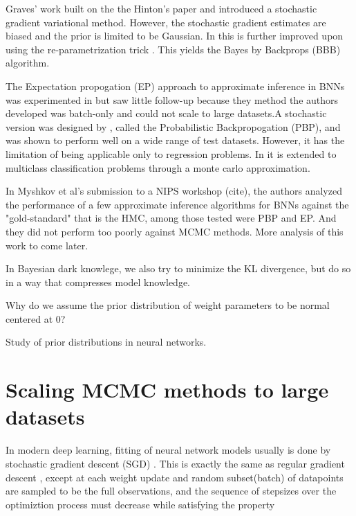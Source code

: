 \documentclass{book}
\begin{document}
\begin{enumerate}
Graves' work \cite{graves2011practical} built on the the Hinton's paper and introduced a stochastic gradient variational method. However, the stochastic gradient estimates are biased and the prior is limited to be Gaussian. In \cite{blundell2015weight} this is further improved upon using the re-parametrization trick \cite{opper2009variational,kingma2013auto,rezende2014stochastic}. This yields the Bayes by Backprops (BBB) algorithm.

The Expectation propogation (EP) approach to approximate inference in BNNs was experimented in \cite{jylanki2014expectation} but saw little follow-up because they method the authors developed was batch-only and could not scale to large datasets.A stochastic version was designed by \cite{hernandez2015probabilistic}, called the Probabilistic Backpropogation (PBP), and was shown to perform well on a wide range of test datasets. However, it has the limitation of being applicable only to regression problems. In \cite{ghosh2016assumed} it is extended to multiclass classification problems through a monte carlo approximation. 

In Myshkov et al's submission to a NIPS workshop (cite), the authors analyzed the performance of a few approximate inference algorithms for BNNs against the "gold-standard" that is the HMC, among those tested were PBP and EP. And they did not perform too poorly against MCMC methods. More analysis of this work to come later.  

In Bayesian dark knowlege, we also try to minimize the KL divergence, but do so
in a way that compresses model knowledge.  

Why do we assume the prior distribution of weight parameters to be normal centered at 0?

Study of prior distributions in neural networks.\cite{lampinen2001bayesian,titterington2004bayesian}

\section{Scaling MCMC methods to large datasets}

In modern deep learning, fitting of neural network models usually is done by stochastic gradient descent (SGD) \cite{ngiam2011optimization}.
This is exactly the same as regular gradient descent \cite{wright1999numerical}, except at each weight update and random subset(batch) of datapoints are sampled to be the full observations, and the sequence of stepsizes over the optimiztion process must decrease while satisfying the property


\end{enumerate}
\end{document}
